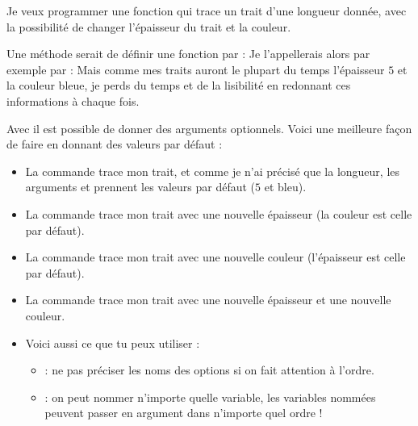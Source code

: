 \documentclass[11pt,class=report,crop=false]{standalone}
\begin{document}
\begin{cours}


Je veux programmer une fonction qui trace un trait d'une longueur donnée, avec la possibilité de changer l'épaisseur du trait et la couleur.

Une méthode serait de définir une fonction par :
 Je l'appellerais alors par exemple par :
Mais comme mes traits auront le plupart du temps l'épaisseur $5$ et la couleur bleue, je perds du temps et de la lisibilité en redonnant ces informations à chaque fois.

\medskip

Avec \Python{} il est possible de donner des arguments optionnels. Voici une meilleure façon de faire en donnant des valeurs par défaut :
 
\begin{itemize}
  \item La commande  trace mon trait, et comme je n'ai précisé que la longueur, les arguments  et  prennent les valeurs par défaut ($5$ et bleu).
  
   \item La commande  trace mon trait avec une nouvelle épaisseur (la couleur est celle par défaut).
   
    \item La commande  trace mon trait avec une nouvelle couleur (l'épaisseur est celle par défaut).  
    
     \item La commande  trace mon trait avec une nouvelle épaisseur et une nouvelle couleur.
     
     \item Voici aussi ce que tu peux utiliser :
     \begin{itemize}
       \item {} : ne pas préciser les noms des options si on fait attention à l'ordre.
       \item {} : on peut nommer n'importe quelle variable, les variables nommées peuvent passer en argument dans n'importe quel ordre !
 
  \end{itemize}   
\end{itemize}   
\end{cours}
\end{document}
